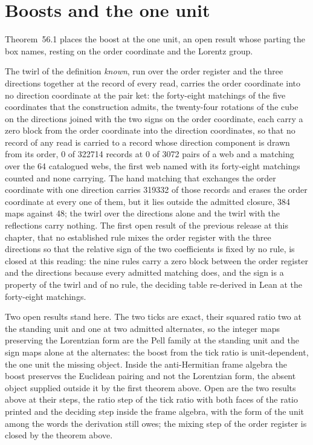 \section{Boosts and the one unit}\label{mod:III-4-boosts-and-the-one-unit}
\label{narr:open:3-4}Theorem~56.1 places the boost at the one unit, an open result whose parting the box names, resting on the order coordinate and the Lorentz group.
\begin{chtheorem}\label{box:III-4-boosts-and-the-one-unit:1}
The twirl of the definition \emph{known}, run over the order register and the three directions together at the record of every read, carries the order coordinate into no direction coordinate at the pair ket: the forty-eight matchings of the five coordinates that the construction admits, the twenty-four rotations of the cube on the directions joined with the two signs on the order coordinate, each carry a zero block from the order coordinate into the direction coordinates, so that no record of any read is carried to a record whose direction component is drawn from its order, 0 of 322714 records at 0 of 3072 pairs of a web and a matching over the 64 catalogued webs, the first web named with its forty-eight matchings counted and none carrying. The hand matching that exchanges the order coordinate with one direction carries 319332 of those records and erases the order coordinate at every one of them, but it lies outside the admitted closure, 384 maps against 48; the twirl over the directions alone and the twirl with the reflections carry nothing. The first open result of the previous release at this chapter, that no established rule mixes the order register with the three directions so that the relative sign of the two coefficients is fixed by no rule, is closed at this reading: the nine rules carry a zero block between the order register and the directions because every admitted matching does, and the sign is a property of the twirl and of no rule, the deciding table re-derived in Lean at the forty-eight matchings.
\end{chtheorem}
\begin{chwall}\label{box:III-4-boosts-and-the-one-unit:2}
Two open results stand here. The two ticks are exact, their squared ratio two at the standing unit and one at two admitted alternates, so the integer maps preserving the Lorentzian form are the Pell family at the standing unit and the sign maps alone at the alternates: the boost from the tick ratio is unit-dependent, the one unit the missing object. Inside the anti-Hermitian frame algebra the boost preserves the Euclidean pairing and not the Lorentzian form, the absent object supplied outside it by the first theorem above.
Open are the two results above at their steps, the ratio step of the tick ratio with both faces of the ratio printed and the deciding step inside the frame algebra, with the form of the unit among the words the derivation still owes; the mixing step of the order register is closed by the theorem above.
\end{chwall}
